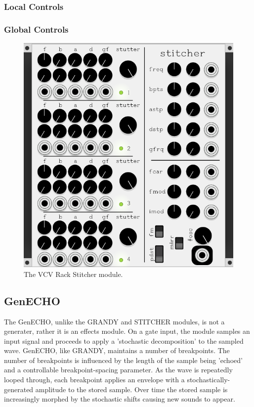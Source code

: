 \documentclass[10pt]{article}
\begin{document}
\subsubsection{Local Controls}

\subsubsection{Global Controls}

\begin{figure}
  \caption{The VCV Rack Stitcher module.}
  \centering
    \includegraphics[height=0.25\textheight]{stitcher}
\end{figure}

\subsection{GenECHO}
The GenECHO, unlike the GRANDY and STITCHER modules, is not a generater, rather it is an effects module. On a gate input, the module samples an input signal and proceeds to apply a 'stochastic decomposition' to the sampled wave. GenECHO, like GRANDY, maintains a number of breakpoints. The number of breakpoints is influenced by the length of the sample being 'echoed' and a controllable breakpoint-spacing parameter. As the wave is repeatedly looped through, each breakpoint applies an envelope with a stochastically-generated amplitude to the stored sample. Over time the stored sample is increasingly morphed by the stochastic shifts causing new sounds to appear.
\end{document}
